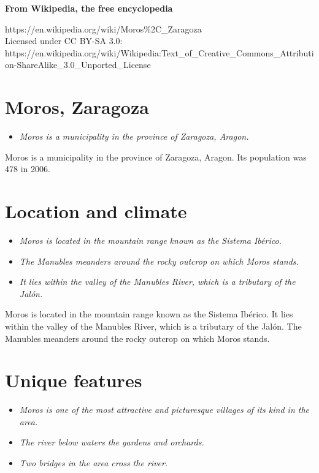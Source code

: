 \textbf{From Wikipedia, the free encyclopedia}

https://en.wikipedia.org/wiki/Moros\%2C\_Zaragoza\\
Licensed under CC BY-SA 3.0:\\
https://en.wikipedia.org/wiki/Wikipedia:Text\_of\_Creative\_Commons\_Attribution-ShareAlike\_3.0\_Unported\_License

\section{Moros, Zaragoza}\label{moros-zaragoza}

\begin{itemize}
\item
  \emph{Moros is a municipality in the province of Zaragoza, Aragon.}
\end{itemize}

Moros is a municipality in the province of Zaragoza, Aragon. Its
population was 478 in 2006.

\section{Location and climate}\label{location-and-climate}

\begin{itemize}
\item
  \emph{Moros is located in the mountain range known as the Sistema
  Ibérico.}
\item
  \emph{The Manubles meanders around the rocky outcrop on which Moros
  stands.}
\item
  \emph{It lies within the valley of the Manubles River, which is a
  tributary of the Jalón.}
\end{itemize}

Moros is located in the mountain range known as the Sistema Ibérico. It
lies within the valley of the Manubles River, which is a tributary of
the Jalón. The Manubles meanders around the rocky outcrop on which Moros
stands.

\section{Unique features}\label{unique-features}

\begin{itemize}
\item
  \emph{Moros is one of the most attractive and picturesque villages of
  its kind in the area.}
\item
  \emph{The river below waters the gardens and orchards.}
\item
  \emph{Two bridges in the area cross the river.}
\end{itemize}

